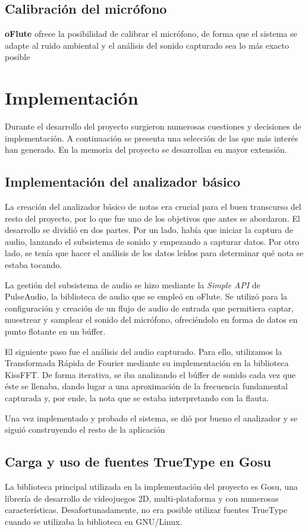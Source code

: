 \documentclass[a4paper,11pt]{article}
\begin{document}
\subsection{Calibración del micrófono}
\textbf{oFlute} ofrece la posibilidad de calibrar el micrófono, de forma que el
sistema se adapte al ruido ambiental y el análisis del sonido capturado sea lo
más exacto posible

\section{Implementación}
Durante el desarrollo del proyecto surgieron numerosas cuestiones y decisiones
de implementación. A continuación se presenta una selección de las que más
interés han generado. En la memoria del proyecto se desarrollan en mayor
extensión.

\subsection{Implementación del analizador básico}
La creación del analizador básico de notas era crucial para el buen transcurso
del resto del proyecto, por lo que fue uno de los objetivos que antes se
abordaron. El desarrollo se dividió en dos partes. Por un lado, había que
iniciar la captura de audio, lanzando el subsistema de sonido y empezando a
capturar datos. Por otro lado, se tenía que hacer el análisis de los datos
leídos para determinar qué nota se estaba tocando.

La gestión del subsistema de audio se hizo mediante la \textit{Simple API} de
PulseAudio, la biblioteca de audio que se empleó en oFlute. Se utilizó para la
configuración y creación de un flujo de audio de entrada que permitiera captar,
muestrear y samplear el sonido del micrófono, ofreciéndolo en forma de datos en
punto flotante en un búffer.

El siguiente paso fue el análisis del audio capturado. Para ello, utilizamos la
Transformada Rápida de Fourier mediante su implementación en la biblioteca
KissFFT. De forma iterativa, se iba analizando el búffer de sonido cada vez que
éste se llenaba, dando lugar a una aproximación de la frecuencia fundamental
capturada y, por ende, la nota que se estaba interpretando con la flauta.

Una vez implementado y probado el sistema, se dió por bueno el analizador y se
siguió construyendo el resto de la aplicación

\subsection{Carga y uso de fuentes TrueType en Gosu}
La biblioteca principal utilizada en la implementación del proyecto es Gosu, una
librería de desarrollo de videojuegos 2D, multi-plataforma y con numerosas
características. Desafortunadamente, no era posible utilizar fuentes TrueType
cuando se utilizaba la biblioteca en GNU/Linux.
\end{document}
